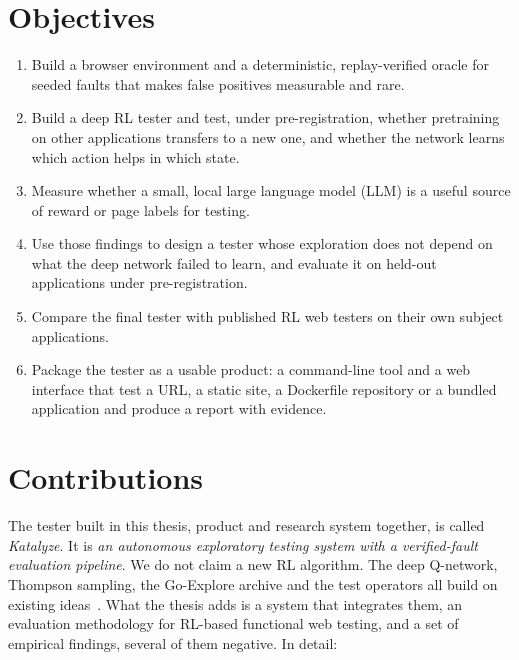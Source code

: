 \section{Objectives}

\begin{enumerate}
  \item Build a browser environment and a deterministic, replay-verified oracle for seeded
        faults that makes false positives measurable and rare.
  \item Build a deep RL tester and test, under pre-registration, whether pretraining on other
        applications transfers to a new one, and whether the network learns which action
        helps in which state.
  \item Measure whether a small, local large language model (LLM) is a useful source of
        reward or page labels for testing.
  \item Use those findings to design a tester whose exploration does not depend on what the
        deep network failed to learn, and evaluate it on held-out applications under
        pre-registration.
  \item Compare the final tester with published RL web testers on their own subject
        applications.
  \item Package the tester as a usable product: a command-line tool and a web interface that
        test a URL, a static site, a Dockerfile repository or a bundled application and
        produce a report with evidence.
\end{enumerate}

\section{Contributions}

The tester built in this thesis, product and research system together, is called
\emph{Katalyze}. It is \emph{an autonomous exploratory testing system with a verified-fault
evaluation pipeline}. We do not claim a new RL algorithm. The deep Q-network, Thompson
sampling, the Go-Explore archive and the test operators all build on existing
ideas~\cite{mnih2015human, russo2018tutorial, ecoffet2021first}. What the thesis adds is a
system that integrates them, an evaluation methodology for RL-based functional web testing,
and a set of empirical findings, several of them negative. In detail:

